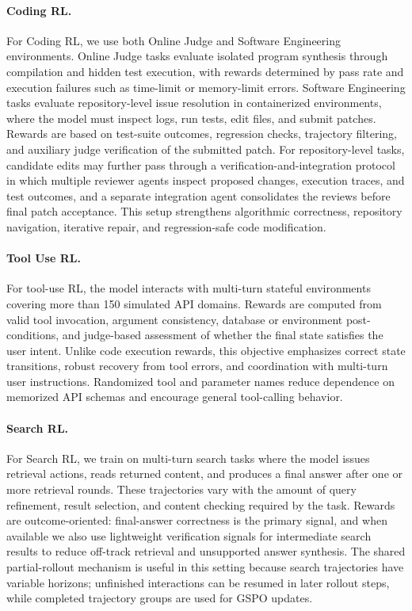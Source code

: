 \documentclass{llmxive}
\begin{document}
\paragraph{Coding RL.}
For Coding RL, we use both Online Judge and Software Engineering environments. Online Judge tasks evaluate isolated program synthesis through compilation and hidden test execution, with rewards determined by pass rate and execution failures such as time-limit or memory-limit errors. Software Engineering tasks evaluate repository-level issue resolution in containerized environments, where the model must inspect logs, run tests, edit files, and submit patches. Rewards are based on test-suite outcomes, regression checks, trajectory filtering, and auxiliary judge verification of the submitted patch. For repository-level tasks, candidate edits may further pass through a verification-and-integration protocol in which multiple reviewer agents inspect proposed changes, execution traces, and test outcomes, and a separate integration agent consolidates the reviews before final patch acceptance. This setup strengthens algorithmic correctness, repository navigation, iterative repair, and regression-safe code modification.

\paragraph{Tool Use RL.}
For tool-use RL, the model interacts with multi-turn stateful environments covering more than 150 simulated API domains. Rewards are computed from valid tool invocation, argument consistency, database or environment post-conditions, and judge-based assessment of whether the final state satisfies the user intent. Unlike code execution rewards, this objective emphasizes correct state transitions, robust recovery from tool errors, and coordination with multi-turn user instructions. Randomized tool and parameter names reduce dependence on memorized API schemas and encourage general tool-calling behavior.

\paragraph{Search RL.}
For Search RL, we train on multi-turn search tasks where the model issues retrieval actions, reads returned content, and produces a final answer after one or more retrieval rounds. These trajectories vary with the amount of query refinement, result selection, and content checking required by the task. Rewards are outcome-oriented: final-answer correctness is the primary signal, and when available we also use lightweight verification signals for intermediate search results to reduce off-track retrieval and unsupported answer synthesis. The shared partial-rollout mechanism is useful in this setting because search trajectories have variable horizons; unfinished interactions can be resumed in later rollout steps, while completed trajectory groups are used for GSPO updates.
\end{document}
